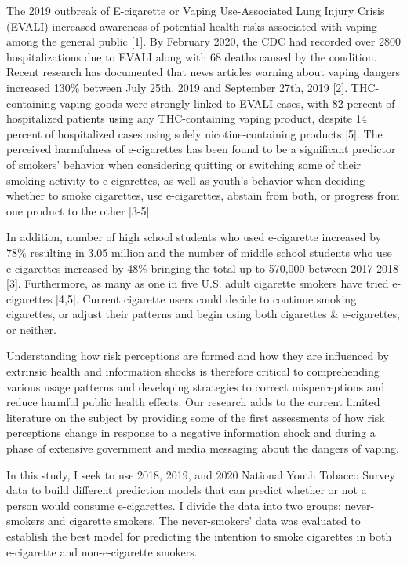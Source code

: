 \documentclass[12pt]{article}
\begin{document}
\hspace{5mm}The 2019 outbreak of E-cigarette or Vaping Use-Associated Lung Injury Crisis (EVALI) increased awareness of potential health risks associated with vaping among the general public [1]. By February 2020, the CDC had recorded over 2800 hospitalizations due to EVALI along with 68 deaths caused by the condition. Recent research has documented that news articles warning about vaping dangers increased 130\% between July 25th, 2019 and September 27th, 2019 [2]. THC-containing vaping goods were strongly linked to EVALI cases, with 82 percent of hospitalized patients using any THC-containing vaping product, despite 14 percent of hospitalized cases using solely nicotine-containing products [5]. The perceived harmfulness of e-cigarettes has been found to be a significant predictor of smokers' behavior when considering quitting or switching some of their smoking activity to e-cigarettes, as well as youth's behavior when deciding whether to smoke cigarettes, use e-cigarettes, abstain from both, or progress from one product to the other [3-5]. 

In addition, number of high school students who used e-cigarette increased by 78\% resulting in 3.05 million and the number of middle school students who use e-cigarettes increased by 48\% bringing the total up to 570,000 between 2017-2018 [3]. Furthermore, as many as one in five U.S. adult cigarette smokers have tried e-cigarettes [4,5]. Current cigarette users could decide to continue smoking cigarettes, or adjust their patterns and begin using both cigarettes \& e-cigarettes, or neither.

Understanding how risk perceptions are formed and how they are influenced by extrinsic health and information shocks is therefore critical to comprehending various usage patterns and developing strategies to correct misperceptions and reduce harmful public health effects. Our research adds to the current limited literature on the subject by providing some of the first assessments of how risk perceptions change in response to a negative information shock and during a phase of extensive government and media messaging about the dangers of vaping.

In this study, I seek to use 2018, 2019, and 2020 National Youth Tobacco Survey data to build different prediction models that can predict whether or not a person would consume e-cigarettes. I divide the data into two groups: never-smokers and cigarette smokers. The never-smokers' data was evaluated to establish the best model for predicting the intention to smoke cigarettes in both e-cigarette and non-e-cigarette smokers.
\end{document}
